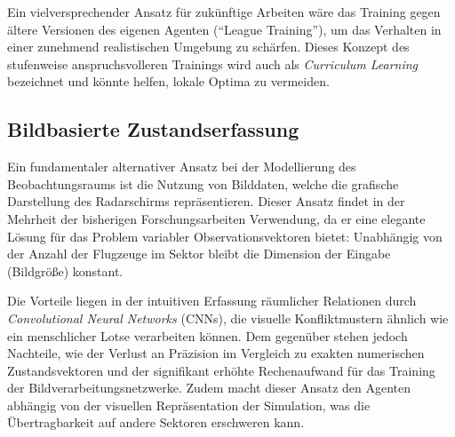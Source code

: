 Ein vielversprechender Ansatz für zukünftige Arbeiten wäre das Training gegen ältere Versionen des eigenen Agenten (\enquote{League Training}), um das Verhalten in einer zunehmend realistischen Umgebung zu schärfen. Dieses Konzept des stufenweise anspruchsvolleren Trainings wird auch als \emph{Curriculum Learning} bezeichnet und könnte helfen, lokale Optima zu vermeiden.

\subsection*{Bildbasierte Zustandserfassung}
Ein fundamentaler alternativer Ansatz bei der Modellierung des Beobachtungsraums ist die Nutzung von Bilddaten, welche die grafische Darstellung des Radarschirms repräsentieren. Dieser Ansatz findet in der Mehrheit der bisherigen Forschungsarbeiten Verwendung, da er eine elegante Lösung für das Problem variabler Observationsvektoren bietet: Unabhängig von der Anzahl der Flugzeuge im Sektor bleibt die Dimension der Eingabe (Bildgröße) konstant.
\medskip

Die Vorteile liegen in der intuitiven Erfassung räumlicher Relationen durch \emph{Convolutional Neural Networks} (CNNs), die visuelle Konfliktmustern ähnlich wie ein menschlicher Lotse verarbeiten können. Dem gegenüber stehen jedoch Nachteile, wie der Verlust an Präzision im Vergleich zu exakten numerischen Zustandsvektoren und der signifikant erhöhte Rechenaufwand für das Training der Bildverarbeitungsnetzwerke. Zudem macht dieser Ansatz den Agenten abhängig von der visuellen Repräsentation der Simulation, was die Übertragbarkeit auf andere Sektoren erschweren kann.